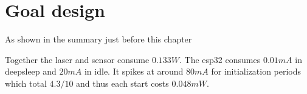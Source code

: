 \section{Goal design}
As shown in the summary just before this chapter


Together the laser and sensor consume $0.133W$. The esp32 consumes $0.01mA$ in deepsleep and $20mA$ in idle. It spikes at around $80mA$ for initialization periods which total $4.3/10$ and thus each start costs $0.048mW$.